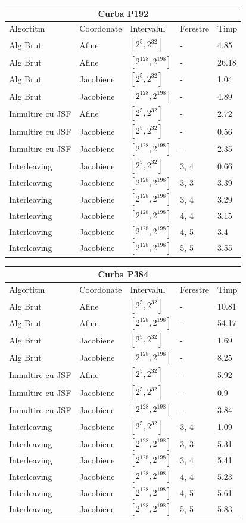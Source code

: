 \begin{tabular}{ |p{5cm}||p{3cm}|p{3cm}|p{2cm}|p{1cm}|  }
 \hline
 \multicolumn{5}{|c|}{Curba P192} \\
 \hline
  Algortitm& Coordonate &Intervalul &Ferestre &Timp\\
 \hline
 Alg Brut & Afine  &$[2^{5},2^{32}]$& - & 4.85\\
 Alg Brut & Afine  &$[2^{128},2^{198}]$& - & 26.18 \\
 Alg Brut & Jacobiene  &$[2^{5},2^{32}]$& - & 1.04 \\
 Alg Brut & Jacobiene  &$[2^{128},2^{198}]$& - & 4.89 \\
 Inmultire cu JSF & Afine  &$[2^{5},2^{32}]$& - & 2.72 \\
 Inmultire cu JSF & Jacobiene  &$[2^{5},2^{32}]$& - & 0.56 \\
 Inmultire cu JSF & Jacobiene  &$[2^{128},2^{198}]$& - & 2.35 \\
 Interleaving & Jacobiene  &$[2^{5},2^{32}]$& 3, 4 & 0.66 \\
 Interleaving & Jacobiene  &$[2^{128},2^{198}]$& 3, 3 & 3.39\\
 Interleaving & Jacobiene  &$[2^{128},2^{198}]$& 3, 4 &  3.29\\
 Interleaving & Jacobiene  &$[2^{128},2^{198}]$& 4, 4 & 3.15 \\
 Interleaving & Jacobiene  &$[2^{128},2^{198}]$& 4, 5 & 3.4 \\
 Interleaving & Jacobiene  &$[2^{128},2^{198}]$& 5, 5 & 3.55 \\
 \hline
\end{tabular}

\begin{tabular}{ |p{5cm}||p{3cm}|p{3cm}|p{2cm}|p{1cm}|  }
 \hline
 \multicolumn{5}{|c|}{Curba P384} \\
  \hline
  Algortitm& Coordonate &Intervalul &Ferestre &Timp\\
 \hline
 Alg Brut & Afine  &$[2^{5},2^{32}]$& - & 10.81\\
 Alg Brut & Afine  &$[2^{128},2^{198}]$& - & 54.17 \\
 Alg Brut & Jacobiene  &$[2^{5},2^{32}]$& - & 1.69 \\
 Alg Brut & Jacobiene  &$[2^{128},2^{198}]$& - & 8.25 \\
 Inmultire cu JSF & Afine  &$[2^{5},2^{32}]$& - & 5.92 \\
 Inmultire cu JSF & Jacobiene  &$[2^{5},2^{32}]$& - & 0.9 \\
 Inmultire cu JSF & Jacobiene  &$[2^{128},2^{198}]$& - & 3.84\\
 Interleaving & Jacobiene  &$[2^{5},2^{32}]$& 3, 4 & 1.09 \\
 Interleaving & Jacobiene  &$[2^{128},2^{198}]$& 3, 3 & 5.31 \\
 Interleaving & Jacobiene  &$[2^{128},2^{198}]$& 3, 4 & 5.41 \\
 Interleaving & Jacobiene  &$[2^{128},2^{198}]$& 4, 4 & 5.23 \\
 Interleaving & Jacobiene  &$[2^{128},2^{198}]$& 4, 5 & 5.61 \\
 Interleaving & Jacobiene  &$[2^{128},2^{198}]$& 5, 5 & 5.83	 \\
 \hline
\end{tabular}
